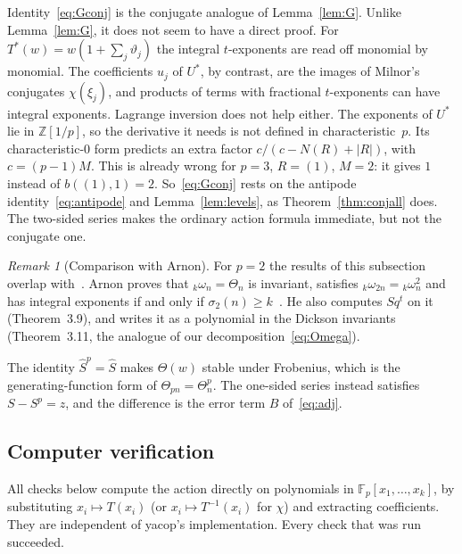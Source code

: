 \documentclass[11pt]{amsart}
\theoremstyle{definition}
\theoremstyle{remark}
\newtheorem{remark}[theorem]{Remark}
\newcommand{\F}{\mathbb{F}_p}
\begin{document}
Identity~\eqref{eq:Gconj} is the conjugate analogue of Lemma~\ref{lem:G}.
Unlike Lemma~\ref{lem:G}, it does not seem to have a direct proof.  For
$T^*(w)=w(1+\sum_j\vartheta_j)$ the integral $t$-exponents are read off
monomial by monomial.  The coefficients $u_j$ of $U^*$, by contrast, are the
images of Milnor's conjugates $\chi(\xi_j)$, and products of terms with
fractional $t$-exponents can have integral exponents.  Lagrange inversion
does not help either.  The exponents of $U^*$ lie in $\mathbb{Z}[1/p]$, so the
derivative it needs is not defined in characteristic~$p$.  Its
characteristic-$0$ form predicts an extra factor
$c/(c-N(R)+|R|)$, with $c=(p-1)M$.  This is already wrong for $p=3$,
$R=(1)$, $M=2$: it gives $1$ instead of $b((1),1)=2$.
So~\eqref{eq:Gconj} rests on the antipode identity~\eqref{eq:antipode} and
Lemma~\ref{lem:levels}, as Theorem~\ref{thm:conjall} does.  The two-sided
series makes the ordinary action formula immediate, but not the conjugate one.

\begin{remark}[Comparison with Arnon]\label{rem:twosided}
For $p=2$ the results of this subsection overlap with~\cite[\S3]{Arnon}.
Arnon proves that ${}_k\omega_n=\Theta_n$ is invariant, satisfies
${}_k\omega_{2n}={}_k\omega_n^2$ and has integral exponents if and only if
$\sigma_2(n)\ge k$~\cite[Prop.~3.4, 3.6]{Arnon}.  He also computes $Sq^t$ on it
(Theorem~3.9), and writes it as a polynomial in the Dickson invariants
(Theorem~3.11, the analogue of our decomposition~\eqref{eq:Omega}).

The identity $\widehat S^p=\widehat S$ makes $\Theta(w)$ stable under
Frobenius, which is the generating-function form of
$\Theta_{pn}=\Theta_n^p$.  The one-sided series instead satisfies
$S-S^p=z$, and the difference is the error term $B$ of~\eqref{eq:adj}.
\end{remark}

\subsection{Computer verification}
All checks below compute the action directly on polynomials in
$\F[x_1,\dots,x_k]$, by substituting $x_i\mapsto T(x_i)$ (or
$x_i\mapsto T^{-1}(x_i)$ for $\chi$) and extracting coefficients.  They are
independent of yacop's implementation.  Every check that was run succeeded.
\end{document}
